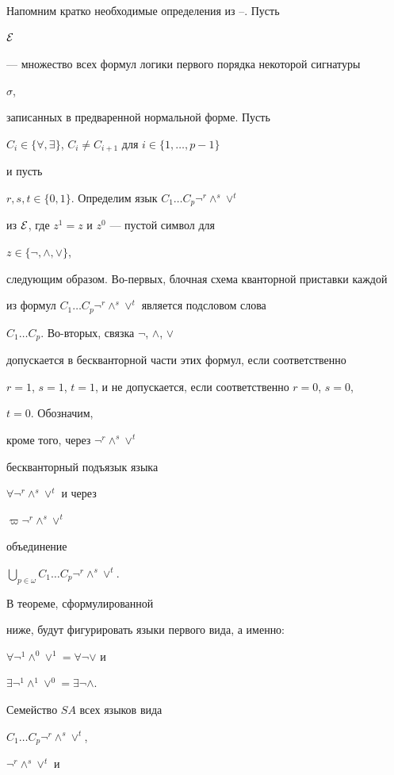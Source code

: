  


Напомним кратко необходимые определения из \cite{4}--\cite{6}. Пусть 


$\cal E$ 


--- множество всех формул логики первого порядка некоторой сигнатуры 


$\sigma$, 


записанных в предваренной нормальной форме. Пусть 


$C_i\in\{\forall,\exists\}$, $C_i\ne C_{i+1}$ для $i\in\{1,\dotsc,p-1\}$ 


и пусть 


$r,s,t\in\{0,1\}$. Определим язык $C_1\dotsc C_p\neg^r\wedge^s\vee^t$ 


из $\cal E$, где $z^1=z$ и $z^0$ --- пустой символ для 


$z\in\{\neg,\wedge,\vee\}$, 


следующим образом. Во-первых, блочная схема кванторной приставки каждой 


из формул $C_1\dotsc C_p\neg^r\wedge^s\vee^t$ является подсловом слова 


$C_1\dotsc C_p$. Во-вторых, связка $\neg$, $\wedge$, $\vee$ 


допускается в бескванторной части этих формул, если соответственно 


$r=1$, $s=1$, $t=1$, и не допускается, если соответственно $r=0$, $s=0$, 


$t=0$. Обозначим, 


кроме того, через $\neg^r\wedge^s\vee^t$ 


бескванторный подъязык языка 


$\forall\neg^r\wedge^s\vee^t$ и через 


$\varpi\neg^r\wedge^s\vee^t$ 


объединение 


$\bigcup\limits_{p\in\omega}C_1\dotsc C_p\neg^r\wedge^s\vee^t$. 


В теореме, сформулированной 


ниже, будут фигурировать языки первого вида, а именно: 


$\forall\neg^1\wedge^0\vee^1=\forall\neg\vee$ и 


$\exists\neg^1\wedge^1\vee^0=\exists\neg\wedge$. 


 


Семейство $SA$ всех языков вида 


$C_1\dotsc C_p\neg^r\wedge^s\vee^t$, 


$\neg^r\wedge^s\vee^t$ и 


